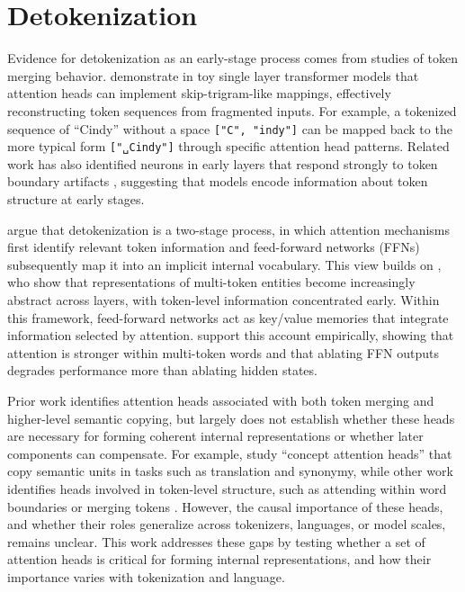\section{Detokenization}\label{sec:background_detokenization}

Evidence for detokenization as an early-stage process comes from studies of token merging behavior. \citet{elhage2021} demonstrate in toy single layer transformer models that attention heads can implement skip-trigram-like mappings, effectively reconstructing token sequences from fragmented inputs. For example, a tokenized sequence of ``Cindy'' without a space \texttt{["C", "indy"]} can be mapped back to the more typical form \texttt{["␣Cindy"]} through specific attention head patterns. Related work has also identified neurons in early layers that respond strongly to token boundary artifacts \citep{elhage2022a}, suggesting that models encode information about token structure at early stages.

\citet{kaplan2025} argue that detokenization is a two-stage process, in which attention mechanisms first identify relevant token information and feed-forward networks (FFNs) subsequently map it into an implicit internal vocabulary. This view builds on \citet{feucht2024}, who show that representations of multi-token entities become increasingly abstract across layers, with token-level information concentrated early. Within this framework, feed-forward networks act as key/value memories \citep{geva2021, geva2022, meng2022} that integrate information selected by attention. \citet{kaplan2025} support this account empirically, showing that attention is stronger within multi-token words and that ablating FFN outputs degrades performance more than ablating hidden states.

Prior work identifies attention heads associated with both token merging and higher-level semantic copying, but largely does not establish whether these heads are necessary for forming coherent internal representations or whether later components can compensate. For example, \citet{feucht2025} study ``concept attention heads'' that copy semantic units in tasks such as translation and synonymy, while other work identifies heads involved in token-level structure, such as attending within word boundaries or merging tokens \citep{ferrando2024informationflow, lad2024, kamoda2025}. However, the causal importance of these heads, and whether their roles generalize across tokenizers, languages, or model scales, remains unclear. This work addresses these gaps by testing whether a set of attention heads is critical for forming internal representations, and how their importance varies with tokenization and language.
